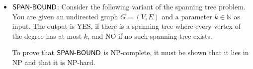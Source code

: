 \begin{enumerate}
\begin{itemize}


            
            
        \item $\textsf{SPAN-BOUND}$: Consider the following variant of 
        the spanning tree problem. You are given an undirected 
        graph $G = (V,E)$ and a parameter $k \in \mathbb{N}$ as 
        input. The output is YES, if there is a spanning tree 
        where every vertex of the degree has at most $k$, and 
        NO if no such spanning tree exists.
        \begin{prove}
        To prove that \(\textsf{SPAN-BOUND}\) is NP‐complete, it must be 
        shown that it lies in NP and that it is NP‐hard.\\


\end{prove}
\end{itemize}
\end{enumerate}

